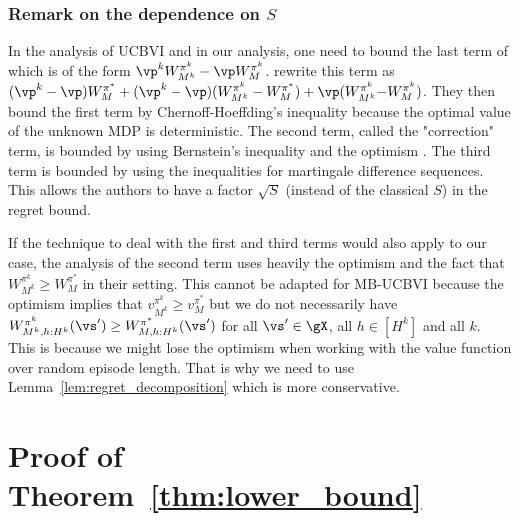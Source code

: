 \begin{subappendices}
\subsubsection{Remark on the dependence on \texorpdfstring{$S$}{}}
\label{sssec:ucbvi_s}

In the analysis of UCBVI and in our analysis, one need to bound the last term of 
which is of the form ${\vp^kW^{\pi^k}_{M^k} -\vp W^{\pi^k}_{M}}$. \cite{azar2017minimax} rewrite this term as
$(\vp^k -\vp)W^{\pi^*}_M +(\vp^k -\vp)(W^{\pi^k}_{M^k} -W^{\pi^*}_M) +\vp(W^{\pi^k}_{M^k} {-}W^{\pi^k}_{M})$.
They then bound the first term by Chernoff-Hoeffding's inequality because the optimal value of the unknown MDP is deterministic.
The second term, called the "correction" term, is bounded by using Bernstein's inequality and the optimism \cite[Step 1, page 6]{azar2017minimax}. The third term is bounded by using the inequalities for martingale difference sequences. This allows the authors to have a factor $\sqrt{S}$ (instead of the classical $S$) in the regret bound.

If the technique to deal with the first and third terms would also apply to our case, the analysis of the second term uses heavily the optimism and the fact that $W^{\pi^k}_{M^k}\ge W^{\pi^*}_{M}$ in their setting. This cannot be adapted for MB-UCBVI because the optimism implies that $v^{\pi^k}_{M^k} \ge v^{\pi^*}_{M}$ but we do not necessarily have $W^{\pi^k}_{M^k,h:H^k}(\vs')\ge W^{\pi^*}_{M,h:H^k}(\vs')$ for all $\vs'\in\gX$, all $h\in[H^k]$ and all $k$. This is because we might lose the optimism when working with the value function over random episode length.
That is why we need to use Lemma~\ref{lem:regret_decomposition} which is more conservative.

\section{Proof of Theorem~\ref{thm:lower_bound}}
\label{apx:sketch_of_proof_lower}


\end{subappendices}
